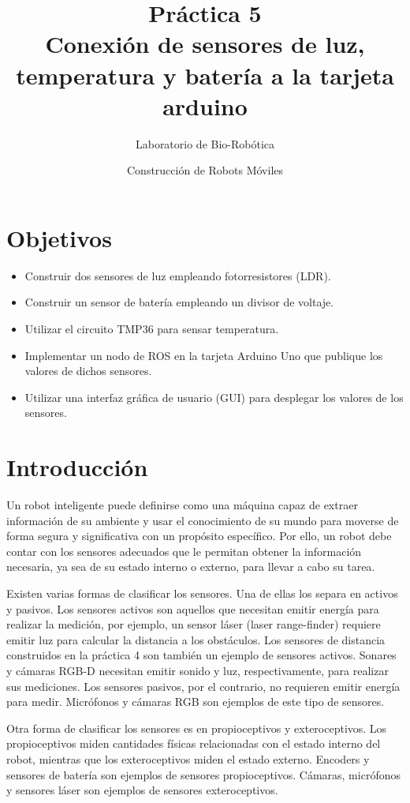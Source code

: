\documentclass[a4paper,12pt]{article}
\title{Práctica 5 \\ Conexión de sensores de luz, temperatura y batería a la tarjeta arduino}
\author{Laboratorio de Bio-Robótica}
\date{Construcción de Robots Móviles}
\begin{document}
\renewcommand{\tablename}{Tabla}
\maketitle
\section*{Objetivos}
\begin{itemize}
\item Construir dos sensores de luz empleando fotorresistores (LDR).
\item Construir un sensor de batería empleando un divisor de voltaje.
\item Utilizar el circuito TMP36 para sensar temperatura.
\item Implementar un nodo de ROS en la tarjeta Arduino Uno que publique los valores  de dichos sensores. 
\item Utilizar una interfaz gráfica de usuario (GUI) para desplegar los valores de los sensores. 
\end{itemize}

\section{Introducción}
Un robot inteligente puede definirse como una máquina capaz de extraer información de su ambiente y usar el conocimiento de su mundo para moverse de forma segura y significativa con un propósito específico. Por ello, un robot debe contar con los sensores adecuados que le permitan obtener la información necesaria, ya sea de su estado interno o externo, para llevar a cabo su tarea. 

Existen varias formas de clasificar los sensores. Una de ellas los separa en activos y pasivos. Los sensores activos son aquellos que necesitan emitir energía para realizar la medición, por ejemplo, un sensor láser (laser range-finder) requiere emitir luz para calcular la distancia a los obstáculos. Los sensores de distancia construidos en la práctica 4 son también un ejemplo de sensores activos. Sonares y cámaras RGB-D necesitan emitir sonido y luz, respectivamente, para realizar sus mediciones. Los sensores pasivos, por el contrario, no requieren emitir energía para medir. Micrófonos y cámaras RGB son ejemplos de este tipo de sensores. 

Otra forma de clasificar los sensores es en propioceptivos y exteroceptivos. Los propioceptivos miden cantidades físicas relacionadas con el estado interno del robot, mientras que los exteroceptivos miden el estado externo. Encoders y sensores de batería son ejemplos de sensores propioceptivos. Cámaras, micrófonos y sensores láser son ejemplos de sensores exteroceptivos. 
\end{document}
